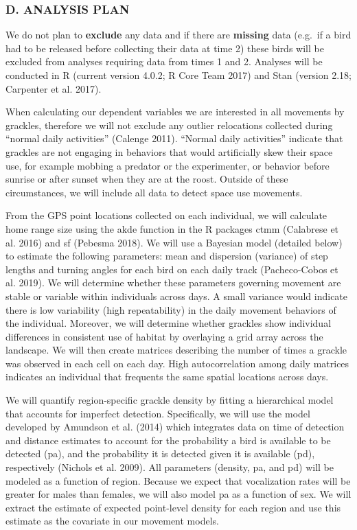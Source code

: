 \documentclass[
]{article}
\begin{document}
\hypertarget{d.-analysis-plan}{%
\subsubsection{D. ANALYSIS PLAN}\label{d.-analysis-plan}}

We do not plan to \textbf{exclude} any data and if there are
\textbf{missing} data (e.g.~if a bird had to be released before
collecting their data at time 2) these birds will be excluded from
analyses requiring data from times 1 and 2. Analyses will be conducted
in R (current version 4.0.2; R Core Team 2017) and Stan (version 2.18;
Carpenter et al. 2017).

When calculating our dependent variables we are interested in all
movements by grackles, therefore we will not exclude any outlier
relocations collected during ``normal daily activities'' (Calenge 2011).
``Normal daily activities'' indicate that grackles are not engaging in
behaviors that would artificially skew their space use, for example
mobbing a predator or the experimenter, or behavior before sunrise or
after sunset when they are at the roost. Outside of these circumstances,
we will include all data to detect space use movements.

From the GPS point locations collected on each individual, we will
calculate home range size using the akde function in the R packages ctmm
(Calabrese et al. 2016) and sf (Pebesma 2018). We will use a Bayesian
model (detailed below) to estimate the following parameters: mean and
dispersion (variance) of step lengths and turning angles for each bird
on each daily track (Pacheco-Cobos et al. 2019). We will determine
whether these parameters governing movement are stable or variable
within individuals across days. A small variance would indicate there is
low variability (high repeatability) in the daily movement behaviors of
the individual. Moreover, we will determine whether grackles show
individual differences in consistent use of habitat by overlaying a grid
array across the landscape. We will then create matrices describing the
number of times a grackle was observed in each cell on each day. High
autocorrelation among daily matrices indicates an individual that
frequents the same spatial locations across days.

We will quantify region-specific grackle density by fitting a
hierarchical model that accounts for imperfect detection. Specifically,
we will use the model developed by Amundson et al. (2014) which
integrates data on time of detection and distance estimates to account
for the probability a bird is available to be detected (pa), and the
probability it is detected given it is available (pd), respectively
(Nichols et al. 2009). All parameters (density, pa, and pd) will be
modeled as a function of region. Because we expect that vocalization
rates will be greater for males than females, we will also model pa as a
function of sex. We will extract the estimate of expected point-level
density for each region and use this estimate as the covariate in our
movement models.
\end{document}
